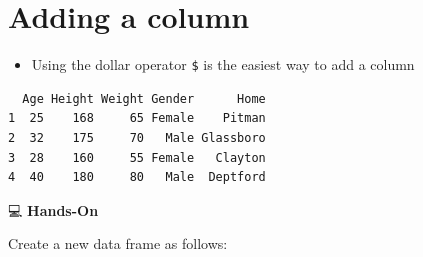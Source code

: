 \documentclass[
  letterpaper,
  DIV=11,
  numbers=noendperiod]{scrreprt}
\newenvironment{Shaded}{\begin{snugshade}}{\end{snugshade}}
\newcommand{\AttributeTok}[1]{\textcolor[rgb]{0.40,0.45,0.13}{#1}}
\newcommand{\DecValTok}[1]{\textcolor[rgb]{0.68,0.00,0.00}{#1}}
\newcommand{\FunctionTok}[1]{\textcolor[rgb]{0.28,0.35,0.67}{#1}}
\newcommand{\NormalTok}[1]{\textcolor[rgb]{0.00,0.23,0.31}{#1}}
\newcommand{\OtherTok}[1]{\textcolor[rgb]{0.00,0.23,0.31}{#1}}
\newcommand{\SpecialCharTok}[1]{\textcolor[rgb]{0.37,0.37,0.37}{#1}}
\newcommand{\StringTok}[1]{\textcolor[rgb]{0.13,0.47,0.30}{#1}}
\providecommand{\tightlist}{%
  \setlength{\itemsep}{0pt}\setlength{\parskip}{0pt}}\usepackage{longtable,booktabs,array}
\begin{document}
\section{Adding a column}\label{adding-a-column}

\begin{itemize}
\tightlist
\item
  Using the dollar operator \texttt{\$} is the easiest way to add a
  column
\end{itemize}

\begin{Shaded}
\end{Shaded}

\begin{verbatim}
  Age Height Weight Gender      Home
1  25    168     65 Female    Pitman
2  32    175     70   Male Glassboro
3  28    160     55 Female   Clayton
4  40    180     80   Male  Deptford
\end{verbatim}

💻 \textbf{Hands-On}

Create a new data frame as follows:
\end{document}
